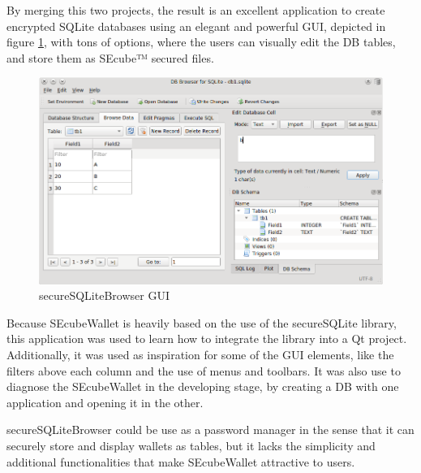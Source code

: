 By merging this two projects, the result is an excellent application to create encrypted SQLite databases using an elegant and powerful GUI, depicted in figure \ref{fig:sqlitebro}, with tons of options, where the users can visually edit the DB tables, and store them as SEcube™ secured files. 

\begin{figure}[htb]
  \centering
  \captionsetup{justification=centering}
  \centerline{\includegraphics[width=1\columnwidth]{chapters/figures/related/sqlitebro.png}}
  \caption{secureSQLiteBrowser GUI}
  \label{fig:sqlitebro}
\end{figure}

Because SEcubeWallet is heavily based on the use of the secureSQLite library, this application was used to learn how to integrate the library into a Qt project. Additionally, it was used as inspiration for some of the GUI elements, like the filters above each column and the use of menus and toolbars. It was also use to diagnose the SEcubeWallet in the developing stage, by creating a DB with one application and opening it in the other. 

secureSQLiteBrowser could be use as a password manager in the sense that it can securely store and display wallets as tables, but it lacks the simplicity and additional functionalities that make SEcubeWallet attractive to users.